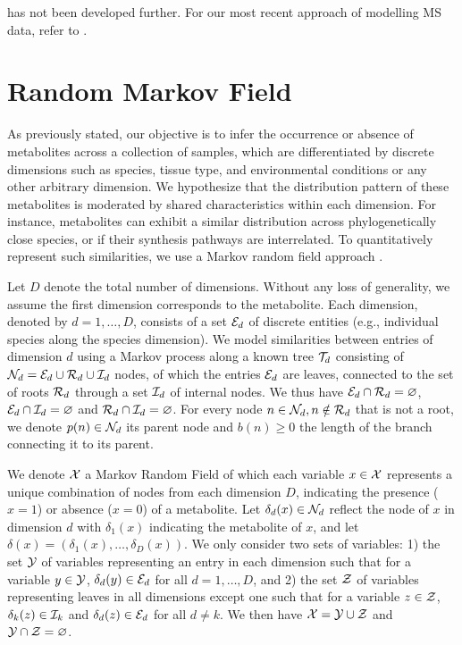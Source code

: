 \documentclass[
11pt, %
oneside, %
english, %
singlespacing, %
headsepline, %
chapterinoneline, %
]{MastersDoctoralThesis} %
\def\E{\mathbb{E}}
\def\E{{\cal E}}
\def\I{{\cal I}}
\def\N{{\cal N}}
\def\R{{\cal R}}
\def\T{{\cal T}}
\def\X{{\cal X}}
\def\Y{{\cal Y}}
\def\Z{{\cal Z}}
\begin{document}
 has not been developed further. For our most recent approach of modelling MS data, refer to .

\section{Random Markov Field}\label{sec:methods:random markov field}

As previously stated, our objective is to infer the occurrence or absence of metabolites across a collection of samples, which are differentiated by discrete dimensions such as species, tissue type, and environmental conditions or any other arbitrary dimension. We hypothesize that the distribution pattern of these metabolites is moderated by shared characteristics within each dimension. For instance, metabolites can exhibit a similar distribution across phylogenetically close species, or if their synthesis pathways are interrelated. To quantitatively represent such similarities, we use a Markov random field approach \cite{sherringtonSolvableModelSpinGlass1975, kindermannMarkovRandomFields1980}.

Let $D$ denote the total number of dimensions. Without any loss of generality, we assume the first dimension corresponds to the metabolite. Each dimension, denoted by $d=1, \ldots, D$, consists of a set $\E_d$ of discrete entities (e.g., individual species along the species dimension). We model similarities between entries of dimension $d$ using a Markov process along a known tree $\T_d$ consisting of $\N_d = \E_d \cup \R_d \cup \I_d$ nodes, of which the entries $\E_d$ are leaves, connected to the set of roots $\R_d$ through a set $\I_d$ of internal nodes. We thus have $\E_d \cap \R_d = \varnothing$, $\E_d \cap \I_d = \varnothing$ and $\R_d \cap \I_d = \varnothing$. For every node $n \in \N_d, n \notin \R_d$ that is not a root, we denote $p(n) \in \N_d$ its parent node and $b(n) \geq 0$ the length of the branch connecting it to its parent.

We denote $\X$ a Markov Random Field of which each variable $x \in \X$ represents a unique combination of nodes from each dimension $D$, indicating the presence ($x=1$) or absence ($x=0$) of a metabolite. Let $\delta_d(x) \in \N_d$ reflect the node of $x$ in dimension $d$ with $\delta_1(x)$ indicating the metabolite of $x$, and let $\delta(x)=(\delta_1(x), \ldots, \delta_D(x))$. We only consider two sets of variables: 1) the set $\Y$ of variables representing an entry in each dimension such that for a variable $y\in\Y$, $\delta_d(y) \in \E_d$ for all $d=1, \ldots, D$, and 2) the set $\Z$ of variables representing leaves in all dimensions except one such that for a variable $z \in \Z$, $\delta_k(z) \in \I_k$ and $\delta_d(z) \in \E_d$ for all $d \neq k$. We then have $\X = \Y \cup \Z$ and $\Y \cap \Z = \varnothing$.
\end{document}
